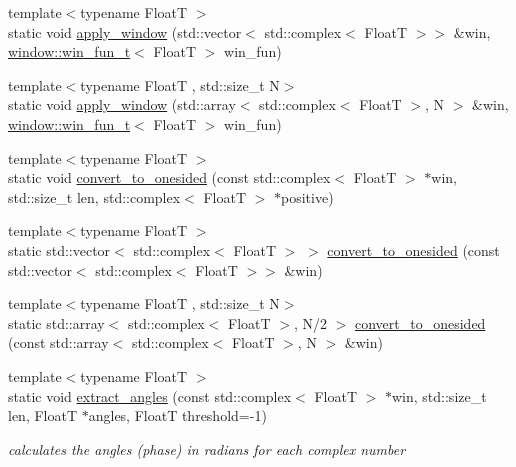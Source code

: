 \begin{DoxyCompactItemize}
\item 
{\footnotesize template$<$typename FloatT $>$ }\\static void \hyperlink{structdevfix_1_1dsp_1_1fft_aeb8a3b7c0b4f290877225c25822e2225}{apply\+\_\+window} (std\+::vector$<$ std\+::complex$<$ FloatT $>$$>$ \&win, \hyperlink{structdevfix_1_1dsp_1_1window_ab2d2c0c5f5fca6dbcf91895115b69eac}{window\+::win\+\_\+fun\+\_\+t}$<$ FloatT $>$ win\+\_\+fun)
\item 
{\footnotesize template$<$typename FloatT , std\+::size\+\_\+t N$>$ }\\static void \hyperlink{structdevfix_1_1dsp_1_1fft_ab3fa5daba56a4dccfa7bef3b980f0866}{apply\+\_\+window} (std\+::array$<$ std\+::complex$<$ FloatT $>$, N $>$ \&win, \hyperlink{structdevfix_1_1dsp_1_1window_ab2d2c0c5f5fca6dbcf91895115b69eac}{window\+::win\+\_\+fun\+\_\+t}$<$ FloatT $>$ win\+\_\+fun)
\item 
{\footnotesize template$<$typename FloatT $>$ }\\static void \hyperlink{structdevfix_1_1dsp_1_1fft_a6ed95d078d9828e160e6d9911c253b5f}{convert\+\_\+to\+\_\+onesided} (const std\+::complex$<$ FloatT $>$ $\ast$win, std\+::size\+\_\+t len, std\+::complex$<$ FloatT $>$ $\ast$positive)
\item 
{\footnotesize template$<$typename FloatT $>$ }\\static std\+::vector$<$ std\+::complex$<$ FloatT $>$ $>$ \hyperlink{structdevfix_1_1dsp_1_1fft_a595260b93cce8bcec41570a93521b263}{convert\+\_\+to\+\_\+onesided} (const std\+::vector$<$ std\+::complex$<$ FloatT $>$$>$ \&win)
\item 
{\footnotesize template$<$typename FloatT , std\+::size\+\_\+t N$>$ }\\static std\+::array$<$ std\+::complex$<$ FloatT $>$, N/2 $>$ \hyperlink{structdevfix_1_1dsp_1_1fft_a7529cbbcd074fe451c13791acfb77fb0}{convert\+\_\+to\+\_\+onesided} (const std\+::array$<$ std\+::complex$<$ FloatT $>$, N $>$ \&win)
\item 
{\footnotesize template$<$typename FloatT $>$ }\\static void \hyperlink{structdevfix_1_1dsp_1_1fft_ac2be4d53cf6ae645c4be7b773f55e3ca}{extract\+\_\+angles} (const std\+::complex$<$ FloatT $>$ $\ast$win, std\+::size\+\_\+t len, FloatT $\ast$angles, FloatT threshold=-\/1)
\begin{DoxyCompactList}\small\item\em calculates the angles (phase) in radians for each complex number \end{DoxyCompactList}\item 

\end{DoxyCompactItemize}

